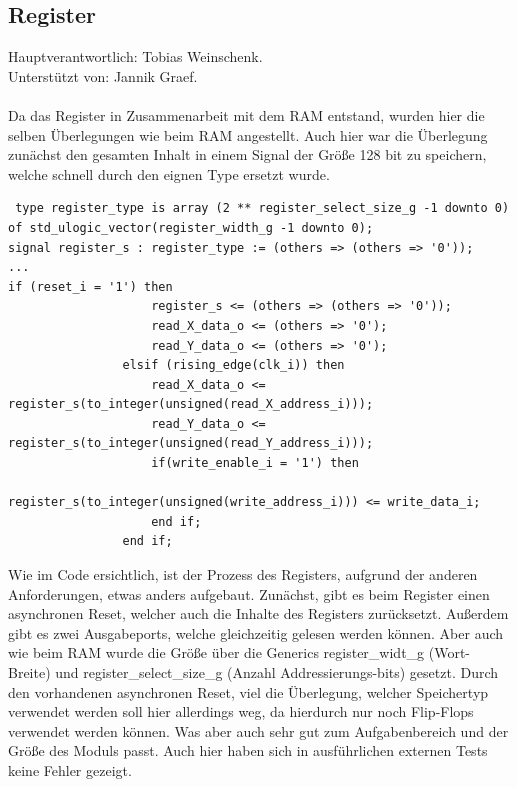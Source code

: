 \documentclass[bibliography=totoc,listof=totoc,index=totoc]{scrartcl}
\begin{document}
\subsection{Register}
Hauptverantwortlich: Tobias Weinschenk.\\ Unterstützt von: Jannik Graef.   \\\\

Da das Register in Zusammenarbeit mit dem RAM entstand, wurden hier die selben Überlegungen wie beim RAM angestellt. Auch hier war die Überlegung zunächst den gesamten Inhalt in einem Signal der Größe 128 bit zu speichern, welche schnell durch den eignen Type ersetzt wurde.
\begin{small}
\begin{verbatim}
 type register_type is array (2 ** register_select_size_g -1 downto 0) of std_ulogic_vector(register_width_g -1 downto 0);
signal register_s : register_type := (others => (others => '0'));
...
if (reset_i = '1') then
                    register_s <= (others => (others => '0'));
                    read_X_data_o <= (others => '0');
                    read_Y_data_o <= (others => '0');
                elsif (rising_edge(clk_i)) then
                    read_X_data_o <= register_s(to_integer(unsigned(read_X_address_i)));
                    read_Y_data_o <= register_s(to_integer(unsigned(read_Y_address_i)));
                    if(write_enable_i = '1') then
                        register_s(to_integer(unsigned(write_address_i))) <= write_data_i;
                    end if;
                end if;
\end{verbatim}
\end{small}
Wie im Code ersichtlich, ist der Prozess des Registers, aufgrund der anderen Anforderungen, etwas anders aufgebaut. Zunächst, gibt es beim Register einen asynchronen Reset, welcher auch die Inhalte des Registers zurücksetzt. Außerdem gibt es zwei Ausgabeports, welche gleichzeitig gelesen werden können. Aber auch wie beim RAM wurde die Größe über die Generics \glqq register\_widt\_g \grqq  \space (Wort-Breite) und \glqq register\_select\_size\_g \grqq \space (Anzahl Addressierungs-bits) gesetzt. Durch den vorhandenen asynchronen Reset, viel die Überlegung, welcher Speichertyp verwendet werden soll hier allerdings weg, da hierdurch nur noch Flip-Flops verwendet werden können. Was aber auch sehr gut zum Aufgabenbereich und der Größe des Moduls passt. Auch hier haben sich in ausführlichen externen Tests keine Fehler gezeigt.
\end{document}
